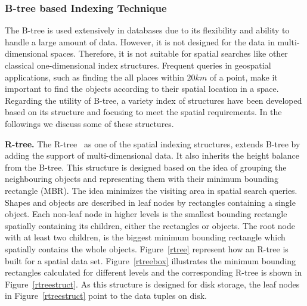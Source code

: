 \documentclass[a4paper,12pt]{article}
\begin{document}
\subsubsection{B-tree based Indexing Technique}
\label{b-tree-based}
The B-tree is used extensively in databases due to its flexibility and ability to handle a large amount of data. However, it is not designed for the data in multi-dimensional spaces. Therefore, it is not suitable for spatial searches like other classical one-dimensional index structures. Frequent queries in geospatial applications, such as finding the all places within $20 km$ of a point, make it important to find the objects according to their spatial location in a space. Regarding the utility of B-tree, a variety index of structures have been developed based on its structure and focusing to meet the spatial requirements. In the followings we discuss some of these structures.

\textbf{R-tree.} The R-tree~\cite{rtree} as one of the spatial indexing structures, extends B-tree by adding the support of multi-dimensional data. It also inherits the height balance from the B-tree. This structure is designed based on the idea of grouping the neighbouring objects and representing them with their minimum bounding rectangle (MBR). The idea minimizes the visiting area in spatial search queries. Shapes and objects are described in leaf nodes by rectangles containing a single object. Each non-leaf node in higher levels is the smallest bounding rectangle spatially containing its children, either the rectangles or objects. The root node with at least two children, is the biggest minimum bounding rectangle which spatially contains the whole objects. Figure~\ref{rtree} represent how an R-tree is built for a spatial data set. Figure~\ref{rtreebox} illustrates the minimum bounding rectangles calculated for different levels
and the corresponding R-tree is shown in Figure~\ref{rtreestruct}.
As this structure is designed for disk storage, the leaf nodes in Figure~\ref{rtreestruct} point to the data tuples on disk.
\end{document}
